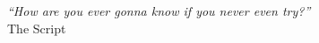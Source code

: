 % 
% 
% 
% 
% 
% 
% 
% 

% 
% 

\thispagestyle{empty}

\begin{flushright}

  \vspace*{\fill}

  \emph{``How are you ever gonna know if you never even try?''}\\ The Script

\end{flushright}  

\vspace{4cm}
\vspace*{\fill}




